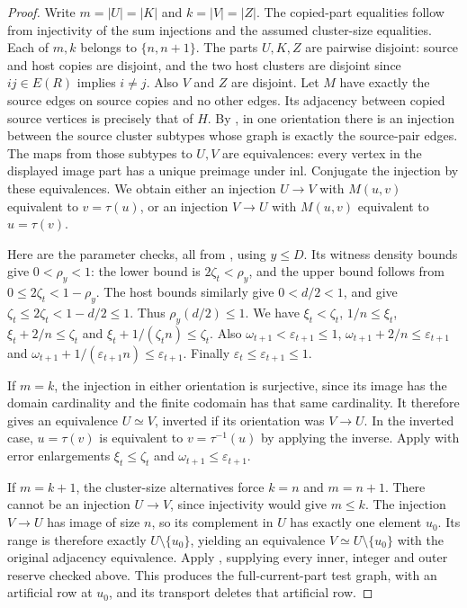 \begin{proof}
Write $m=|U|=|K|$ and $k=|V|=|Z|$. The copied-part equalities follow
from injectivity of the sum injections and the assumed cluster-size
equalities. Each of $m,k$ belongs to $\{n,n+1\}$. The parts $U,K,Z$
are pairwise disjoint: source and host copies are disjoint, and the
two host clusters are disjoint since $ij\in E(R)$ implies $i\ne j$.
Also $V$ and $Z$ are disjoint.
Let $M$ have exactly the source edges on source copies and no other
edges. Its adjacency between copied source vertices is precisely that
of $H$. By , in one orientation there
is an injection between the source cluster subtypes whose graph is
exactly the source-pair edges. The maps from those subtypes to $U,V$
are equivalences: every vertex in the displayed image part has a
unique preimage under $\mathrm{inl}$. Conjugate the injection by these
equivalences. We obtain either an injection $U\to V$ with
$M(u,v)$ equivalent to $v=\tau(u)$, or an injection $V\to U$ with
$M(u,v)$ equivalent to $u=\tau(v)$.

Here are the parameter checks, all from
, using $y\le D$.
Its witness density bounds give $0<\rho_y<1$: the lower bound is
$2\zeta_t<\rho_y$, and the upper bound follows from
$0\le2\zeta_t<1-\rho_y$. The host bounds similarly give
$0<d/2<1$, and give $\zeta_t\le2\zeta_t<1-d/2\le1$.
Thus $\rho_y(d/2)\le1$. We have
$\xi_t<\zeta_t$, $1/n\le\xi_t$,
$\xi_t+2/n\le\zeta_t$ and
$\xi_t+1/(\zeta_t n)\le\zeta_t$.
Also $\omega_{t+1}<\varepsilon_{t+1}\le1$,
$\omega_{t+1}+2/n\le\varepsilon_{t+1}$ and
$\omega_{t+1}+1/(\varepsilon_{t+1}n)\le\varepsilon_{t+1}$.
Finally $\varepsilon_t\le\varepsilon_{t+1}\le1$.

If $m=k$, the injection in either orientation is surjective, since its
image has the domain cardinality and the finite codomain has that same
cardinality. It therefore gives an equivalence $U\simeq V$, inverted
if its orientation was $V\to U$. In the inverted case,
$u=\tau(v)$ is equivalent to $v=\tau^{-1}(u)$ by applying the inverse.
Apply  with error
enlargements $\xi_t\le\zeta_t$ and
$\omega_{t+1}\le\varepsilon_{t+1}$.

If $m=k+1$, the cluster-size alternatives force $k=n$ and $m=n+1$.
There cannot be an injection $U\to V$, since injectivity would give
$m\le k$. The injection $V\to U$ has image of size $n$, so its
complement in $U$ has exactly one element $u_0$. Its range is therefore
exactly $U\setminus\{u_0\}$, yielding an equivalence
$V\simeq U\setminus\{u_0\}$ with the original adjacency equivalence.
Apply , supplying every
inner, integer and outer reserve checked above. This produces the
full-current-part test graph, with an artificial row at $u_0$, and its
transport deletes that artificial row.


\end{proof}
